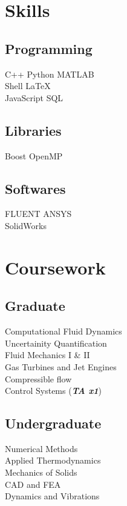 \documentclass[]{resume}
\begin{document}
\begin{minipage}[t]{0.33\textwidth}

\section{Skills}
\subsection{Programming}
C++ \textbullet{} Python \textbullet{} MATLAB \\
Shell \textbullet{} \LaTeX\ \\
JavaScript \textbullet{} SQL \\
\sectionsep
\subsection{Libraries}
Boost \textbullet{} OpenMP \\
\sectionsep
\subsection{Softwares}
FLUENT \textbullet{} ANSYS \textbullet{} \\
SolidWorks \\


\section{Coursework}
\subsection{Graduate}
Computational Fluid Dynamics \\
Uncertainity Quantification \\
Fluid Mechanics I \& II \\
Gas Turbines and Jet Engines \\
Compressible flow \\
Control Systems (\textbf{\textit{TA x1}}) \\
\sectionsep

\subsection{Undergraduate}
Numerical Methods \\
Applied Thermodynamics \\
Mechanics of Solids \\
CAD and FEA \\
Dynamics and Vibrations \\

%
%

\end{minipage}
\end{document}
